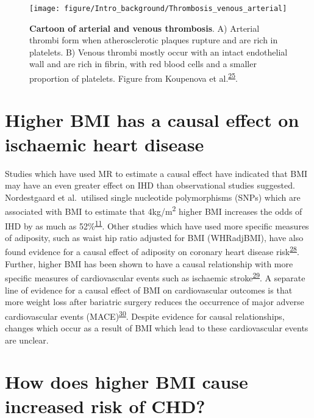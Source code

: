 \documentclass[11pt,twoside]{bristolthesis}
\begin{document}
\begin{figure}
\texttt{[image: figure/Intro\_background/Thrombosis\_venous\_arterial]} \caption[Cartoon of arterial and venous thrombosis]{\textbf{Cartoon of arterial and venous thrombosis}. A) Arterial thrombi form when atherosclerotic plaques rupture and are rich in platelets. B) Venous thrombi mostly occur with an intact endothelial wall and are rich in fibrin, with red blood cells and a smaller proportion of platelets. Figure from Koupenova et al.\textsuperscript{\protect\hyperlink{ref-Koupenova2017a}{25}}.}\label{fig:thrombi-cartoon}
\end{figure}
\hypertarget{higher-bmi-has-a-causal-effect-on-ischaemic-heart-disease}{%
\section{Higher BMI has a causal effect on ischaemic heart disease}\label{higher-bmi-has-a-causal-effect-on-ischaemic-heart-disease}}

Studies which have used MR to estimate a causal effect have indicated that BMI may have an even greater effect on IHD than observational studies suggested. Nordestgaard et al.~utilised single nucleotide polymorphisms (SNPs) which are associated with BMI to estimate that 4kg/m\textsuperscript{2} higher BMI increases the odds of IHD by as much as 52\%\textsuperscript{\protect\hyperlink{ref-Nordestgaard2012}{11}}. Other studies which have used more specific measures of adiposity, such as waist hip ratio adjusted for BMI (WHRadjBMI), have also found evidence for a causal effect of adiposity on coronary heart disease risk\textsuperscript{\protect\hyperlink{ref-Dale2017}{28}}. Further, higher BMI has been shown to have a causal relationship with more specific measures of cardiovascular events such as ischaemic stroke\textsuperscript{\protect\hyperlink{ref-Harshfield2021}{29}}. A separate line of evidence for a causal effect of BMI on cardiovascular outcomes is that more weight loss after bariatric surgery reduces the occurrence of major adverse cardiovascular events (MACE)\textsuperscript{\protect\hyperlink{ref-Jimenez2021}{30}}. Despite evidence for causal relationships, changes which occur as a result of BMI which lead to these cardiovascular events are unclear.

\hypertarget{how-does-higher-bmi-cause-increased-risk-of-chd}{%
\section{How does higher BMI cause increased risk of CHD?}\label{how-does-higher-bmi-cause-increased-risk-of-chd}}
\end{document}
